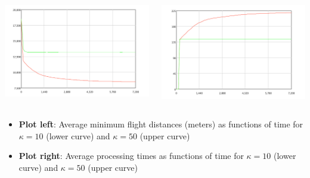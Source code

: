 \documentclass[UKenglish]{beamer}
\begin{document}
\begin{frame}
\begin{columns}[T]
\begin{column}{0.5\textwidth}
\centering
\includegraphics[width=\textwidth]{MathDept-images/distance_simul.png}
\end{column}
\begin{column}{0.5\textwidth}
\centering
\includegraphics[width=\textwidth]{MathDept-images/number_process.png}
\end{column}
\end{columns}
\begin{itemize}
    \item \textbf{Plot left}: Average minimum flight distances (meters) as functions of time for $\kappa = 10$ (lower curve) and $\kappa = 50$ (upper curve)
    \item \textbf{Plot right}: Average processing times as functions of time for $\kappa = 10$ (lower curve) and $\kappa = 50$ (upper curve)
\end{itemize}
\end{frame}
\end{document}
